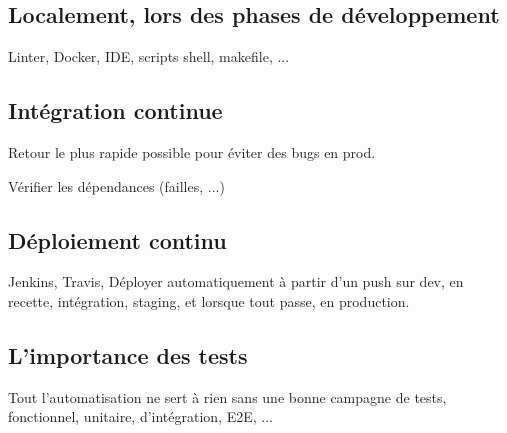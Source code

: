 \subsection{Localement, lors des phases de développement}

Linter, Docker, IDE, scripts shell, makefile, ...

\subsection{Intégration continue}

Retour le plus rapide possible pour éviter des bugs en prod. 

Vérifier les dépendances (failles, ...)

\subsection{Déploiement continu}

Jenkins, Travis, Déployer automatiquement à partir d'un push sur dev, en recette, intégration, staging, et lorsque tout passe, en production.

\subsection{L'importance des tests}

Tout l'automatisation ne sert à rien sans une bonne campagne de tests, fonctionnel, unitaire, d'intégration, E2E, ...

